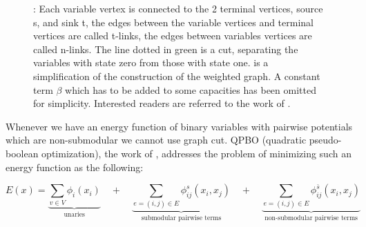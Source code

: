 \begin{figure}[H]
\begin{center}
\hspace{1.5cm}
\end{center}
\caption{
    : Each variable vertex is connected to the 2 terminal vertices, source s, and
        sink t, the edges between the variable vertices and terminal vertices are
        called t-links, the edges between variables vertices are called n-links. The
        line dotted in green is a cut, separating the variables with state zero from
        those with state one.
     is a simplification of the construction of the weighted graph.
        A constant term $\beta$ which has to be added to some capacities
        has been omitted for simplicity. 
        Interested readers are referred to  the work of \citet{kolmogorov_2004_pami}.
}\label{fig:graph_cut}
\end{figure}


Whenever we have an energy function of binary variables with pairwise potentials which
are non-submodular we cannot use graph cut. QPBO (quadratic pseudo-boolean optimization), 
the work of \citet{rother_2007_cvpr}, 
addresses the problem of minimizing such an energy function as the
following:

\begin{equation} \label{eq:gm_qpbo_energy}
    E(x) = 
    \underbrace{
        \sum_{v \in V} \phi_i(x_i)
    }_{\text{unaries}}
    \quad +  \quad
    \underbrace{
        \sum_{e=(i,j) \in E } \phi^{s}_{ij}(x_i,x_j)
    }_{\text{submodular pairwise terms}}
    \quad +  \quad
    \underbrace{
        \sum_{e=(i,j) \in E } \phi^{\bar{s}}_{ij}(x_i,x_j)
    }_{\text{non-submodular pairwise terms}}
\end{equation}

